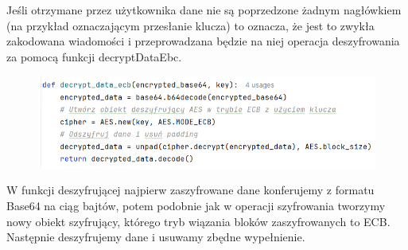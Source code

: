 Jeśli otrzymane przez użytkownika dane nie są poprzedzone żadnym nagłówkiem (na przykład oznaczającym przesłanie klucza) to oznacza, że jest to zwykła zakodowana wiadomości i przeprowadzana będzie na niej operacja deszyfrowania za pomocą funkcji decryptDataEbc.
\begin{figure}[H]
    \centering
    \includegraphics[width=\textwidth]{Images/CodeX23.png}
\end{figure}
W funkcji deszyfrującej najpierw zaszyfrowane dane konferujemy z formatu Base64 na ciąg bajtów, potem podobnie jak w operacji szyfrowania tworzymy nowy obiekt szyfrujący, którego tryb wiązania bloków zaszyfrowanych to ECB. Następnie deszyfrujemy dane i usuwamy zbędne wypełnienie.